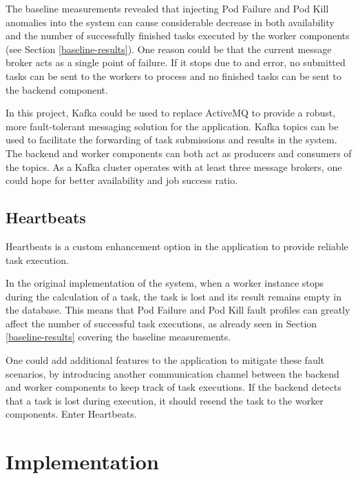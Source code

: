 The baseline measurements revealed that injecting Pod Failure and Pod Kill anomalies into the system can cause considerable decrease in both availability and the number of successfully finished tasks executed by the worker components (see Section \ref{baseline-results}). One reason could be that the current message broker acts as a single point of failure. If it stops due to and error, no submitted tasks can be sent to the workers to process and no finished tasks can be sent to the backend component.

In this project, Kafka could be used to replace ActiveMQ to provide a robust, more fault-tolerant messaging solution for the application. Kafka topics can be used to facilitate the forwarding of task submissions and results in the system. The backend and worker components can both act as producers and consumers of the topics. As a Kafka cluster operates with at least three message brokers, one could hope for better availability and job success ratio.

\subsection{Heartbeats}

Heartbeats is a custom enhancement option in the application to provide reliable task execution.

In the original implementation of the system, when a worker instance stops during the calculation of a task, the task is lost and its result remains empty in the database. This means that Pod Failure and Pod Kill fault profiles can greatly affect the number of successful task executions, as already seen in Section \ref{baseline-results} covering the baseline measurements.

One could add additional features to the application to mitigate these fault scenarios, by introducing another communication channel between the backend and worker components to keep track of task executions. If the backend detects that a task is lost during execution, it should resend the task to the worker components. Enter Heartbeats.

\section{Implementation} \label{enhancements-impl}

